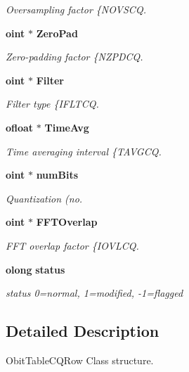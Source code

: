 \begin{CompactItemize}
\begin{CompactList}\small\item\em Oversampling factor \{NOVSCQ. \item\end{CompactList}\item 
{\bf oint} $\ast$ {\bf Zero\-Pad}
\begin{CompactList}\small\item\em Zero-padding factor \{NZPDCQ. \item\end{CompactList}\item 
{\bf oint} $\ast$ {\bf Filter}
\begin{CompactList}\small\item\em Filter type \{IFLTCQ. \item\end{CompactList}\item 
{\bf ofloat} $\ast$ {\bf Time\-Avg}
\begin{CompactList}\small\item\em Time averaging interval \{TAVGCQ. \item\end{CompactList}\item 
{\bf oint} $\ast$ {\bf num\-Bits}
\begin{CompactList}\small\item\em Quantization (no. \item\end{CompactList}\item 
{\bf oint} $\ast$ {\bf FFTOverlap}
\begin{CompactList}\small\item\em FFT overlap factor \{IOVLCQ. \item\end{CompactList}\item 
{\bf olong} {\bf status}
\begin{CompactList}\small\item\em status 0=normal, 1=modified, -1=flagged \item\end{CompactList}\end{CompactItemize}


\subsection{Detailed Description}
Obit\-Table\-CQRow Class structure. 



